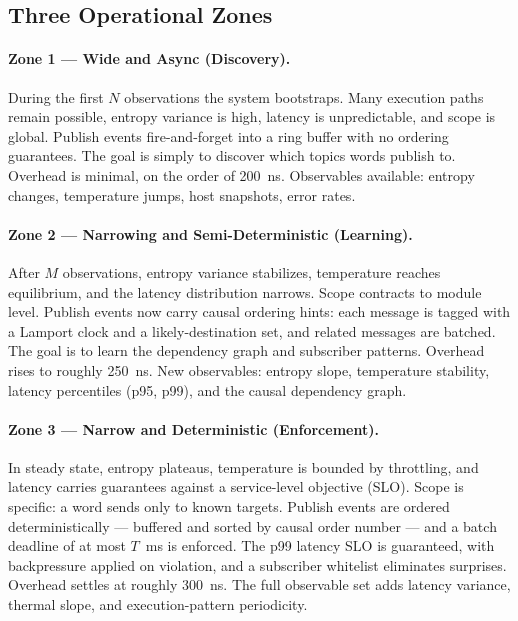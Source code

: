 \subsection{Three Operational Zones}

\paragraph{Zone 1 --- Wide and Async (Discovery).} During the first $N$
observations the system bootstraps. Many execution paths remain possible, entropy
variance is high, latency is unpredictable, and scope is global. Publish events
fire-and-forget into a ring buffer with no ordering guarantees. The goal is simply
to discover which topics words publish to. Overhead is minimal, on the order of
200~ns. Observables available: entropy changes, temperature jumps, host snapshots,
error rates.

\paragraph{Zone 2 --- Narrowing and Semi-Deterministic (Learning).} After $M$
observations, entropy variance stabilizes, temperature reaches equilibrium, and
the latency distribution narrows. Scope contracts to module level. Publish events
now carry causal ordering hints: each message is tagged with a Lamport clock and a
likely-destination set, and related messages are batched. The goal is to learn the
dependency graph and subscriber patterns. Overhead rises to roughly 250~ns.
New observables: entropy slope, temperature stability, latency percentiles (p95,
p99), and the causal dependency graph.

\paragraph{Zone 3 --- Narrow and Deterministic (Enforcement).} In steady state,
entropy plateaus, temperature is bounded by throttling, and latency carries
guarantees against a service-level objective (SLO). Scope is specific: a word sends
only to known targets. Publish events are ordered deterministically --- buffered
and sorted by causal order number --- and a batch deadline of at most $T$~ms is
enforced. The p99 latency SLO is guaranteed, with backpressure applied on
violation, and a subscriber whitelist eliminates surprises. Overhead settles at
roughly 300~ns. The full observable set adds latency variance, thermal slope, and
execution-pattern periodicity.


